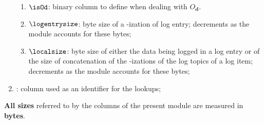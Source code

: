 \begin{enumerate}
\begin{enumerate}
            \item $\isOd$: binary column to define when dealing with $O_{\mathbf{d}}$.
            \item $\logentrysize$: byte size of a \rlp{}-ization of log entry; decrements as the module accounts for these bytes;
            \item $\localsize$: byte size of either the data being logged in a log entry or of the size of concatenation of the \rlp{}-izations of the log topics of a log item; decrements as the module accounts for these bytes;
        \end{enumerate}
    \item \Phase{}: column used as an identifier for the lookups;

\end{enumerate}
\saNote{} \textbf{All sizes} referred to by the columns of the present module are measured in \textbf{bytes}. 
